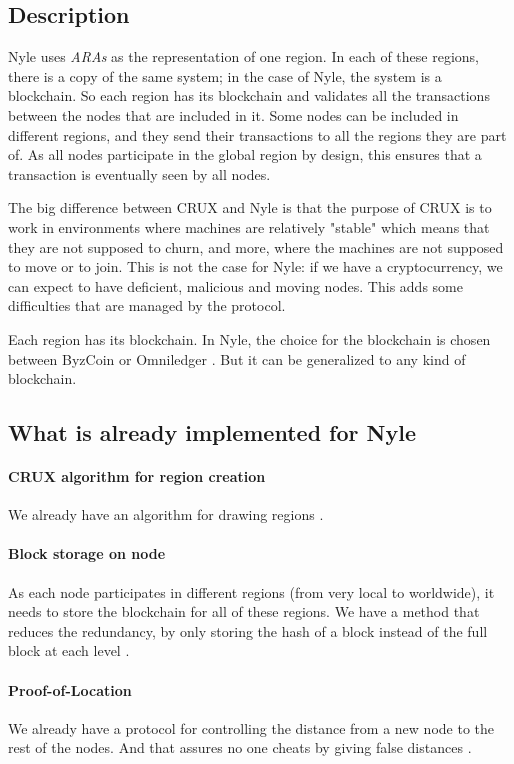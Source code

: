 \documentclass[a4paper,11pt,oneside]{report}
\begin{document}
\subsection{Description}

Nyle uses \textit{ARAs} as the representation of one region. In each of these
regions, there is a copy of the same system; in the case of Nyle, the
system is a blockchain. So each region has its blockchain and validates
all the transactions between the nodes that are included in it. Some nodes can
be included in different regions, and they send their transactions to all
the regions they are part of. As all nodes participate in the global region by
design, this ensures that a transaction is eventually seen by all nodes.

The big difference between CRUX \cite{Basescu2014} and Nyle is that the purpose
of CRUX \cite{Basescu2014} is to work in environments where machines are
relatively "stable" which means that they are not supposed to churn, and more,
where the machines are not supposed to move or to join. This is not the case
for Nyle: if we have a cryptocurrency, we can expect to have deficient,
malicious and moving nodes. This adds some difficulties that are
managed by the protocol.

Each region has its blockchain. In Nyle, the choice for the blockchain is chosen between ByzCoin \cite{Kogias2016} or Omniledger
\cite{Kokoris-Kogias2017}. But it can be generalized to any kind of blockchain.

\subsection{What is already implemented for Nyle} \paragraph{CRUX algorithm for
region creation} We already have an algorithm for drawing regions
\cite{Basescu2014}.

\paragraph{Block storage on node} As each node participates in different
regions (from very local to worldwide), it needs to store the blockchain
for all of these regions. We have a method that reduces the redundancy, by only
storing the hash of a block instead of the full block at each level
\cite{Sierro2019}. 

\paragraph{Proof-of-Location} We already have a protocol for controlling the
distance from a new node to the rest of the nodes. And that assures no one
cheats by giving false distances \cite{Kall2019}. 
\end{document}
